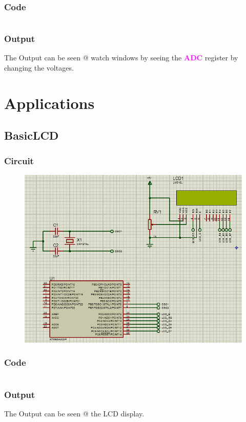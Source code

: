 \documentclass[oneside]{book}
\newcommand{\regFormat}[1]{\textbf{\textcolor{magenta}{#1}}}
\begin{document}
\subsection{Code}
\inputminted[bgcolor=black]{c}{./programFiles/AnalogToDigital.c}

\subsection{Output}
\quad The Output can be seen @ watch windows by seeing the \regFormat{ADC} register by changing the voltages.


\chapter{Applications}
\section{BasicLCD}
\subsection{Circuit}
\begin{figure}[H]
    \centering
    \includegraphics[height=0.2\textheight]{BasicLCD.png}
\end{figure}
\subsection{Code}
\inputminted[bgcolor=black]{c}{./programFiles/BasicLCD.c}

\subsection{Output}
\quad The Output can be seen @ the LCD display.
\end{document}
